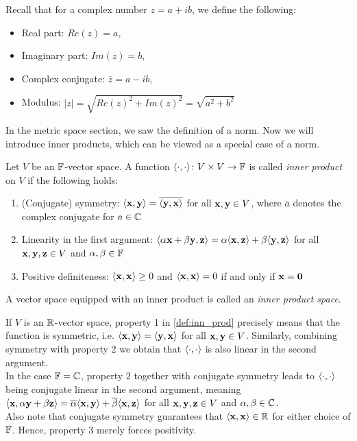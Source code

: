 \documentclass{article}
\begin{document}
Recall that for a complex number $z = a + ib$, we define the following:
\begin{itemize}
\item Real part: $Re(z) = a$,
\item Imaginary part: $Im(z) = b$,
\item Complex conjugate: $\overline{z}= a -ib$, 
\item Modulus: $|z| = \sqrt{Re(z)^2 + Im(z)^2} = \sqrt{a^2 + b^2}$
\end{itemize}


In the metric space section, we saw the definition of a norm. Now we will introduce inner products, which can be viewed as a special case of a norm. 
\begin{definition}\label{def:inn_prod}
Let $V$ be an ${\mathbb{F}}$-vector space. A function $\langle \cdot,\cdot \rangle \colon V \times V \to {\mathbb{F}}$ is called \emph{inner product} on $V$ if the following holds:
\begin{enumerate}
    \item (Conjugate) symmetry: $\langle {\mathbf{x}},{\mathbf{y}} \rangle = \overline{\langle {\mathbf{y}},{\mathbf{x}} \rangle}$ for all ${\mathbf{x}},{\mathbf{y}}\in V$, where $\overline{a}$ denotes the complex conjugate for $a\in {\mathbb{C}}$
    \item Linearity in the first argument: $\langle \alpha {\mathbf{x}} + \beta {\mathbf{y}}, {\mathbf{z}} \rangle = \alpha \langle {\mathbf{x}},{\mathbf{z}} \rangle + \beta \langle {\mathbf{y}},{\mathbf{z}} \rangle$ for all ${\mathbf{x}},{\mathbf{y}},{\mathbf{z}}\in V$ and $\alpha, \beta \in {\mathbb{F}}$
    \item Positive definiteness: $\langle {\mathbf{x}},{\mathbf{x}} \rangle \geq 0$ and $\langle {\mathbf{x}},{\mathbf{x}} \rangle = 0$ if and only if ${\mathbf{x}} = {\mathbf{0}}$ 
\end{enumerate}
A vector space equipped with an inner product is called an \emph{inner product space}.
\end{definition}


If $V$ is an ${\mathbb{R}}$-vector space, property 1 in \cref{def:inn_prod} precisely means that the function is symmetric, i.e. $\langle {\mathbf{x}},{\mathbf{y}} \rangle = \langle {\mathbf{y}},{\mathbf{x}} \rangle$ for all ${\mathbf{x}},{\mathbf{y}}\in V$. Similarly, combining symmetry with property 2 we obtain that $\langle \cdot,\cdot \rangle$ is also linear in the second argument. \\
In the case ${\mathbb{F}} = {\mathbb{C}}$, property 2 together with conjugate symmetry leads to $\langle \cdot,\cdot \rangle$ being conjugate linear in the second argument, meaning $\langle {\mathbf{x}},\alpha {\mathbf{y}} +\beta {\mathbf{z}} \rangle = \overline{\alpha} \langle {\mathbf{x}},{\mathbf{y}} \rangle + \overline{\beta} \langle {\mathbf{x}},{\mathbf{z}} \rangle$ for all ${\mathbf{x}},{\mathbf{y}},{\mathbf{z}}\in V$ and $\alpha, \beta \in {\mathbb{C}}$.\\
Also note that conjugate symmetry guarantees that $\langle {\mathbf{x}},{\mathbf{x}} \rangle \in {\mathbb{R}}$ for either choice of ${\mathbb{F}}$. Hence, property 3 merely forces positivity. 
\end{document}
